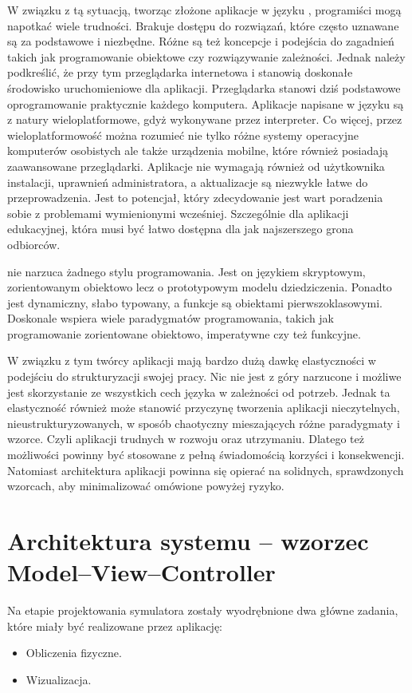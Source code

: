 W związku z tą sytuacją, tworząc złożone aplikacje w języku \js, programiści
mogą napotkać wiele trudności. Brakuje dostępu do rozwiązań, które często
uznawane są za podstawowe i niezbędne. Różne są też koncepcje i podejścia do
zagadnień takich jak programowanie obiektowe czy rozwiązywanie zależności.
Jednak należy podkreślić, że przy tym przeglądarka internetowa i \js stanowią
doskonałe środowisko uruchomieniowe dla aplikacji. Przeglądarka stanowi dziś
podstawowe oprogramowanie praktycznie każdego komputera. Aplikacje napisane w
języku \js są z natury wieloplatformowe, gdyż wykonywane przez interpreter. Co
więcej, przez wieloplatformowość można rozumieć nie tylko różne systemy
operacyjne komputerów osobistych ale także urządzenia mobilne, które również
posiadają zaawansowane przeglądarki. Aplikacje \js nie wymagają również od
użytkownika instalacji, uprawnień administratora, a aktualizacje są niezwykle
łatwe do przeprowadzenia. Jest to potencjał, który zdecydowanie jest wart
poradzenia sobie z problemami wymienionymi wcześniej. Szczególnie dla aplikacji
edukacyjnej, która musi być łatwo dostępna dla jak najszerszego grona odbiorców.

\js nie narzuca żadnego stylu programowania. Jest on językiem skryptowym,
zorientowanym obiektowo lecz o prototypowym modelu dziedziczenia. Ponadto jest
dynamiczny, słabo typowany, a funkcje są obiektami pierwszoklasowymi. Doskonale
wspiera wiele paradygmatów programowania, takich jak programowanie zorientowane
obiektowo, imperatywne czy też funkcyjne.

W związku z tym twórcy aplikacji mają bardzo dużą dawkę elastyczności w
podejściu do strukturyzacji swojej pracy. Nic nie jest z góry narzucone i
możliwe jest skorzystanie ze wszystkich cech języka w zależności od potrzeb.
Jednak ta elastyczność również może stanowić przyczynę tworzenia aplikacji
nieczytelnych, nieustrukturyzowanych, w sposób chaotyczny mieszających różne
paradygmaty i wzorce. Czyli aplikacji trudnych w rozwoju oraz utrzymaniu.
Dlatego też możliwości \js powinny być stosowane z pełną świadomością korzyści i
konsekwencji. Natomiast architektura aplikacji powinna się opierać na solidnych,
sprawdzonych wzorcach, aby minimalizować omówione powyżej ryzyko.

\section{Architektura systemu -- wzorzec Model--View--Controller}

Na etapie projektowania symulatora \en zostały wyodrębnione dwa główne zadania,
które miały być realizowane przez aplikację:
\begin{itemize}
\item Obliczenia fizyczne.
\item Wizualizacja.
\end{itemize}

